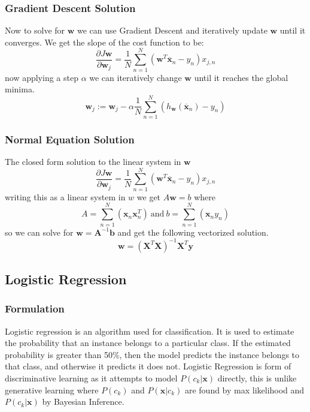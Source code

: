 \documentclass[12pt]{article}
\begin{document}
    \subsubsection{Gradient Descent Solution}
        Now to solve for $\boldsymbol{w}$ we can use Gradient Descent and iteratively update $\boldsymbol{w}$ until it converges. We get the slope of the cost function to be:
        $$ \frac{\partial J{\boldsymbol{w}}}{\partial \boldsymbol{w}_j} = \frac{1}{N}\sum_{n=1}^N(\boldsymbol{w}^T\overline{\boldsymbol{x}}_n-y_n)x_{j,n} $$
        now applying a step $\alpha$ we can iteratively change $\boldsymbol{w}$ until it reaches the global minima. 
        $$ \boldsymbol{w}_j := \boldsymbol{w}_j - \alpha \frac{1}{N}\sum_{n=1}^{N}(h_{\boldsymbol{w}}(\overline{\boldsymbol{x}}_n) - y_n) $$

    \subsubsection{Normal Equation Solution}
        The closed form solution to the linear system in $\boldsymbol{w}$
        $$ \frac{\partial J{\boldsymbol{w}}}{\partial \boldsymbol{w}_j} = \frac{1}{N}\sum_{n=1}^N(\boldsymbol{w}^T\overline{\boldsymbol{x}}_n-y_n)x_{j,n} $$
        writing this as a linear system in $w$ we get $A\boldsymbol{w} = b$ where
        $$ A = \sum_{n=1}^N(\boldsymbol{x}_n \boldsymbol{x}_n^T) \ \textrm{and} \ b = \sum_{n=1}^N(\boldsymbol{x}_n y_n) $$
        so we can solve for $\boldsymbol{w} = \boldsymbol{A}^{-1}\boldsymbol{b}$ and get the following vectorized solution.
        $$ \boldsymbol{w} = (\boldsymbol{X}^T\boldsymbol{X})^{-1} \boldsymbol{X}^T\boldsymbol{y} $$
    
    \subsection{Logistic Regression}
        \subsubsection{Formulation}
            Logistic regression is an algorithm used for classification. It is used to estimate the probability that an instance belongs to a particular class. If the estimated probability is
            greater than 50\%, then the model predicts the instance belongs to that class, and otherwise it predicts it does not. Logistic Regression is form of discriminative learning as it attempts 
            to model $P(c_k|\boldsymbol{x})$ directly, this is unlike generative learning where $P(c_k)$ and $P(\boldsymbol{x}|c_k)$ are found by max likelihood and $P(c_k|\boldsymbol{x})$ by Bayesian Inference.
\end{document}
